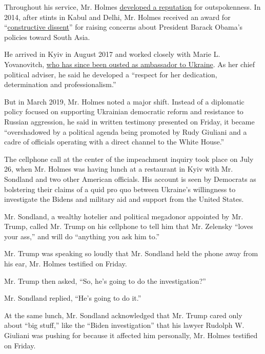 Throughout his service, Mr. Holmes
\href{https://www.afsa.org/sites/default/files/flipping_book/0914/files/assets/basic-html/page60.html}{developed
a reputation} for outspokenness. In 2014, after stints in Kabul and
Delhi, Mr. Holmes received an award for
``\href{https://www.washingtonpost.com/politics/state-department-official-who-overheard-trump-phone-call-on-ukraine-has-experience-speaking-his-mind/2019/11/14/be49edba-070c-11ea-b17d-8b867891d39d_story.html}{constructive
dissent}'' for raising concerns about President Barack Obama's policies
toward South Asia.

He arrived in Kyiv in August 2017 and worked closely with Marie L.
Yovanovitch,
\href{https://www.nytimes.com/2019/11/15/us/politics/marie-yovanovitch-facts-bio.html}{who
has since been ousted as ambassador to Ukraine}. As her chief political
adviser, he said he developed a ``respect for her dedication,
determination and professionalism.''

But in March 2019, Mr. Holmes noted a major shift. Instead of a
diplomatic policy focused on supporting Ukrainian democratic reform and
resistance to Russian aggression, he said in written testimony presented
on Friday, it became ``overshadowed by a political agenda being promoted
by Rudy Giuliani and a cadre of officials operating with a direct
channel to the White House.''

The cellphone call at the center of the impeachment inquiry took place
on July 26, when Mr. Holmes was having lunch at a restaurant in Kyiv
with Mr. Sondland and two other American officials. His account is seen
by Democrats as bolstering their claims of a quid pro quo between
Ukraine's willingness to investigate the Bidens and military aid and
support from the United States.

Mr. Sondland, a wealthy hotelier and political megadonor appointed by
Mr. Trump, called Mr. Trump on his cellphone to tell him that Mr.
Zelensky ``loves your ass,'' and will do ``anything you ask him to.''

Mr. Trump was speaking so loudly that Mr. Sondland held the phone away
from his ear, Mr. Holmes testified on Friday.

Mr. Trump then asked, ``So, he's going to do the investigation?''

Mr. Sondland replied, ``He's going to do it.''

At the same lunch, Mr. Sondland acknowledged that Mr. Trump cared only
about ``big stuff,'' like the ``Biden investigation'' that his lawyer
Rudolph W. Giuliani was pushing for because it affected him personally,
Mr. Holmes testified on Friday.

